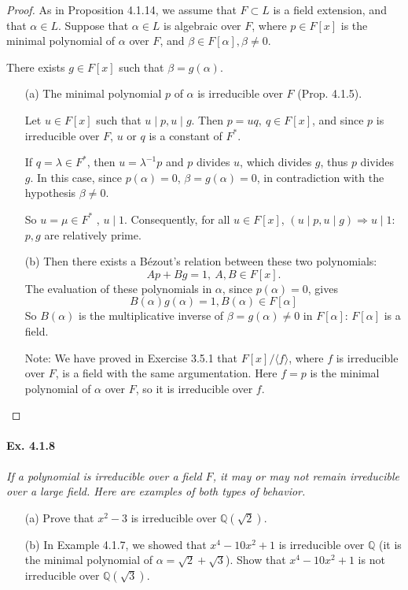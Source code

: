 \documentclass[11pt,a4paper]{article}
\newcommand{\Q}{\mathbb{Q}}
\begin{document}
\begin{proof}
As in Proposition 4.1.14, we assume that $F\subset L$ is a field extension, and that $\alpha \in L$. Suppose that $\alpha\in L$ is algebraic over $F$, where $p \in F[x]$ is the minimal polynomial of $\alpha$ over $F$,  and $\beta \in F[\alpha],\beta \neq 0$.

There exists $g \in F[x]$ such that $\beta = g(\alpha)$.

\begin{enumerate}
\item[(a)] The minimal polynomial $p$ of $\alpha$ is irreducible over $F$ (Prop. 4.1.5).

Let $u\in F[x]$ such that $u \mid p, u \mid g$. Then
$p = uq,\ q\in F[x]$, and since $p$ is irreducible over $F$,  $u$ or $q$ is a constant of $F^*$.

If $q =\lambda \in F^*$, then $u = \lambda^{-1} p $ and $p$ 
divides $u$, which divides $g$, thus $p$ divides $g$. In this case, since $p(\alpha) = 0$, $\beta = g(\alpha) = 0$, in contradiction with the hypothesis $\beta \neq 0$.

So $u = \mu \in F^*$ , $u \mid 1$. Consequently, for all $u \in F[x]$, $(u \mid p, u \mid g) \Rightarrow u\mid 1$: $p,g$ are relatively prime.

\item[(b)]  Then there exists a B\'ezout's relation between these two polynomials:
$$Ap + Bg = 1, \ A,B \in F[x].$$
The evaluation of these polynomials in $\alpha$, since $p(\alpha)=0$, gives
$$B(\alpha) g(\alpha) = 1, B(\alpha) \in F[\alpha]$$
So $B(\alpha)$ is the multiplicative inverse of $\beta = g(\alpha)\neq 0$ in $F[\alpha]$: $F[\alpha]$ is a field.

Note: We have proved in Exercise 3.5.1 that $F[x]/\langle f\rangle$, where $f$ is irreducible over $F$,  is a field with the same argumentation. Here $f = p$ is the minimal polynomial  of $\alpha$ over $F$, so it is irreducible over $f$.
\end{enumerate}
\end{proof}

\paragraph{Ex. 4.1.8}

{\it If a polynomial is irreducible over a field $F$, it may or may not remain irreducible over a large field. Here are examples of both types of behavior.
\begin{enumerate}
\item[(a)] Prove that $x^2-3$ is irreducible over $\Q(\sqrt{2})$.
\item[(b)] In Example 4.1.7, we showed that $x^4 -10x^2+1$ is irreducible over $\Q$ (it is the minimal polynomial of $\alpha = \sqrt{2}+\sqrt{3}$). Show that $x^4-10x^2+1$ is not irreducible over $\Q(\sqrt{3})$.
\end{enumerate}
}
\end{document}
